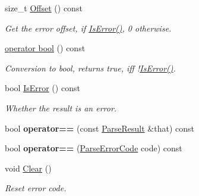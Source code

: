 \begin{DoxyCompactItemize}
size\+\_\+t \hyperlink{structParseResult_afbe762766ac21b2aae266105f1dfa643}{Offset} () const
\begin{DoxyCompactList}\small\item\em Get the error offset, if \hyperlink{structParseResult_adfe0ef5b994e82f8aa9ebf0b30c924b1}{Is\+Error()}, 0 otherwise. \end{DoxyCompactList}\item 
\mbox{\label{structParseResult_a4cec9590497f982dec42e9f0763d5d73}} 
\hyperlink{structParseResult_a4cec9590497f982dec42e9f0763d5d73}{operator bool} () const
\begin{DoxyCompactList}\small\item\em Conversion to {\ttfamily bool}, returns {\ttfamily true}, iff !\hyperlink{structParseResult_adfe0ef5b994e82f8aa9ebf0b30c924b1}{Is\+Error()}. \end{DoxyCompactList}\item 
\mbox{\label{structParseResult_adfe0ef5b994e82f8aa9ebf0b30c924b1}} 
bool \hyperlink{structParseResult_adfe0ef5b994e82f8aa9ebf0b30c924b1}{Is\+Error} () const
\begin{DoxyCompactList}\small\item\em Whether the result is an error. \end{DoxyCompactList}\item 
\mbox{\label{structParseResult_a4d98465a5dc6055e367a7ea7089fc73d}} 
bool {\bfseries operator==} (const \hyperlink{structParseResult}{Parse\+Result} \&that) const
\item 
\mbox{\label{structParseResult_a6de18a7e43013b2defc51d892c2cf90f}} 
bool {\bfseries operator==} (\hyperlink{group__RAPIDJSON__ERRORS_ga8d4b32dfc45840bca189ade2bbcb6ba7}{Parse\+Error\+Code} code) const
\item 
\mbox{\label{structParseResult_a88b6d44f052a19e6436ae6aadc2c40b4}} 
void \hyperlink{structParseResult_a88b6d44f052a19e6436ae6aadc2c40b4}{Clear} ()
\begin{DoxyCompactList}\small\item\em Reset error code. \end{DoxyCompactList}\item 
\mbox{\label{structParseResult_aa81b4a7b776b77216cb752385203a8c1}} 

\end{DoxyCompactItemize}
